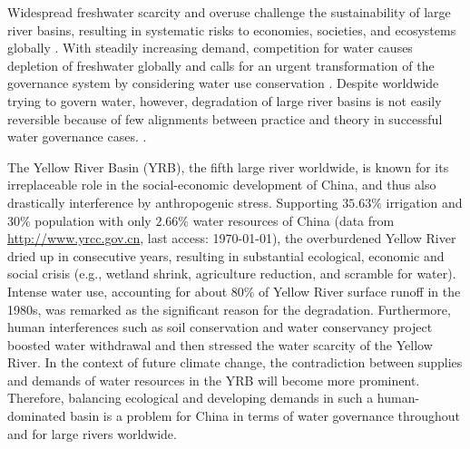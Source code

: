 Widespread freshwater scarcity and overuse challenge the sustainability of large river basins, resulting in systematic risks to economies, societies, and ecosystems globally \cite{distefano2017, dolan2021, xu2020b, mekonnen2016}.
With steadily increasing demand, competition for water causes depletion of freshwater globally and calls for an urgent transformation of the governance system by considering water use conservation \cite{gleick2010, ziolkowska2016, wang2019d}.
Despite worldwide trying to govern water, however, degradation of large river basins is not easily reversible because of few alignments between practice and theory in successful water governance cases.
\cite{giuliani2013, falkenmark2019, jaeger2019}.

The Yellow River Basin (YRB), the fifth large river worldwide, is known for its irreplaceable role in the social-economic development of China, and thus also drastically interference by anthropogenic stress.
Supporting $35.63\%$ irrigation and $30\%$ population with only $2.66\%$ water resources of China (data from \href{http://www.yrcc.gov.cn}{http://www.yrcc.gov.cn}, last access: \today), the overburdened Yellow River dried up in consecutive years, resulting in substantial ecological, economic and social crisis (e.g., wetland shrink, agriculture reduction, and scramble for water).
Intense water use, accounting for about $80\%$ of Yellow River surface runoff in the 1980s, was remarked as the significant reason for the degradation.
Furthermore, human interferences such as soil conservation and water conservancy project boosted water withdrawal and then stressed the water scarcity of the Yellow River.
In the context of future climate change, the contradiction between supplies and demands of water resources in the YRB will become more prominent.
Therefore, balancing ecological and developing demands in such a human-dominated basin is a problem for China in terms of water governance throughout and for large rivers worldwide.

